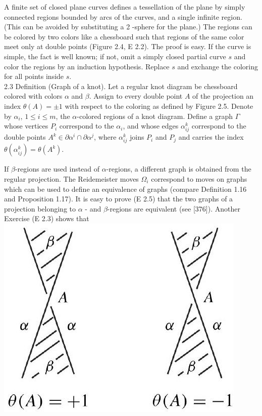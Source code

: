 \documentclass[10pt, letterpaper]{article}
\begin{document}
A finite set of closed plane curves defines a tessellation of the plane by simply connected regions bounded by arcs of the curves, and a single infinite region. (This can be avoided by substituting a 2 -sphere for the plane.) The regions can be colored by two colors like a chessboard such that regions of the same color meet only at double points (Figure 2.4, E 2.2). The proof is easy. If the curve is simple, the fact is well known; if not, omit a simply closed partial curve $s$ and color the regions by an induction hypothesis. Replace $s$ and exchange the coloring for all points inside $s$.\\
2.3 Definition (Graph of a knot). Let a regular knot diagram be chessboard colored with colors $\alpha$ and $\beta$. Assign to every double point $A$ of the projection an index $\theta(A)= \pm 1$ with respect to the coloring as defined by Figure 2.5. Denote by $\alpha_{i}$, $1 \leq i \leq m$, the $\alpha$-colored regions of a knot diagram. Define a graph $\Gamma$ whose vertices $P_{i}$ correspond to the $\alpha_{i}$, and whose edges $\alpha_{i j}^{k}$ correspond to the double points $A^{k} \in \partial \alpha^{i} \cap \partial \alpha^{j}$, where $\alpha_{i j}^{k}$ joins $P_{i}$ and $P_{j}$ and carries the index $\theta\left(\alpha_{i j}^{k}\right)=\theta\left(A^{k}\right)$.

If $\beta$-regions are used instead of $\alpha$-regions, a different graph is obtained from the regular projection. The Reidemeister moves $\Omega_{i}$ correspond to moves on graphs which can be used to define an equivalence of graphs (compare Definition 1.16 and Proposition 1.17). It is easy to prove (E 2.5) that the two graphs of a projection belonging to $\alpha$ - and $\beta$-regions are equivalent (see [376]). Another Exercise (E 2.3) shows that\\
\includegraphics[scale=0.2, center]{2025_05_21_9c06be8de7a55410f8c1g-032}
\end{document}
